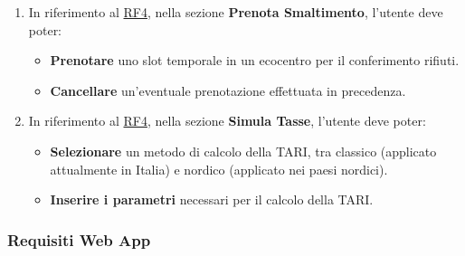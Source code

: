 \begin{enumerate}[start=3,label=\textbf{RF\theenumi}, labelwidth=4em, left=0pt, labelsep=1em, align=left]
    \item \label{itm:RF8}   In riferimento al \hyperref[itm:RF4]{RF4}, nella sezione \textbf{Prenota Smaltimento}, l'utente deve poter:
    \begin{itemize}
        \item \textbf{Prenotare} uno slot temporale in un ecocentro per il conferimento rifiuti.
        \item \textbf{Cancellare} un'eventuale prenotazione effettuata in precedenza.
    \end{itemize}

    \item \label{itm:RF9}   In riferimento al \hyperref[itm:RF4]{RF4}, nella sezione \textbf{Simula Tasse}, l'utente deve poter:
    \begin{itemize}
        \item \textbf{Selezionare} un metodo di calcolo della TARI, tra classico (applicato attualmente in Italia) e nordico (applicato nei paesi nordici).
        \item \textbf{Inserire i parametri} necessari per il calcolo della TARI.
    \end{itemize}

\end{enumerate}

\subsubsection{Requisiti Web App}

